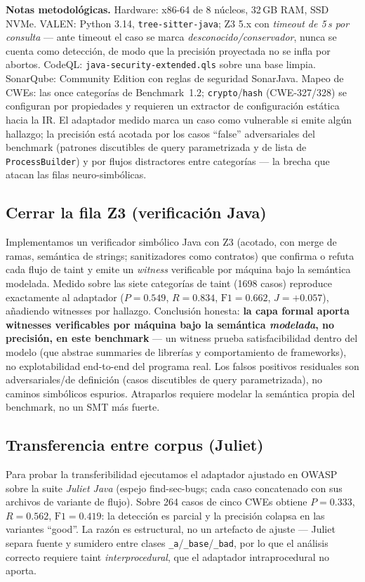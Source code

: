 \documentclass[11pt]{article}
\begin{document}
\noindent\textbf{Notas metodológicas.} Hardware: x86-64 de 8 núcleos, 32\,GB RAM,
SSD NVMe. VALEN: Python 3.14, \texttt{tree-sitter-java}; Z3 5.x con
\emph{timeout de 5\,s por consulta} --- ante timeout el caso se marca
\emph{desconocido/conservador}, nunca se cuenta como detección, de modo que la
precisión proyectada no se infla por abortos. CodeQL:
\texttt{java-security-extended.qls} sobre una base limpia. SonarQube: Community
Edition con reglas de seguridad SonarJava. Mapeo de CWEs: las once categorías de
Benchmark~1.2; \texttt{crypto}/\texttt{hash} (CWE-327/328) se configuran por
propiedades y requieren un extractor de configuración estática hacia la IR. El
adaptador medido marca un caso como vulnerable si emite algún hallazgo; la
precisión está acotada por los casos ``false'' adversariales del benchmark
(patrones discutibles de query parametrizada y de lista de \texttt{ProcessBuilder})
y por flujos distractores entre categorías --- la brecha que atacan las filas
neuro-simbólicas.

\subsection{Cerrar la fila Z3 (verificación Java)}
Implementamos un verificador simbólico Java con Z3 (acotado, con merge de ramas,
semántica de strings; sanitizadores como contratos) que confirma o refuta cada
flujo de taint y emite un \emph{witness} verificable por máquina bajo la semántica modelada. Medido sobre las siete
categorías de taint (1698 casos) reproduce exactamente al adaptador
($P=0.549$, $R=0.834$, $\mathrm{F1}=0.662$, $J=+0.057$), añadiendo witnesses por
hallazgo. Conclusión honesta: \textbf{la capa formal aporta witnesses
verificables por máquina bajo la semántica \emph{modelada}, no precisión, en este
benchmark} --- un witness prueba satisfacibilidad dentro del modelo (que abstrae
summaries de librerías y comportamiento de frameworks), no explotabilidad
end-to-end del programa real. Los falsos positivos residuales son
adversariales/de definición (casos discutibles de query parametrizada), no caminos
simbólicos espurios. Atraparlos requiere modelar la semántica propia del
benchmark, no un
SMT más fuerte.

\subsection{Transferencia entre corpus (Juliet)}
Para probar la transferibilidad ejecutamos el adaptador ajustado en OWASP sobre
la suite \emph{Juliet Java} (espejo find-sec-bugs; cada caso concatenado con sus
archivos de variante de flujo). Sobre 264 casos de cinco CWEs obtiene
$P=0.333$, $R=0.562$, $\mathrm{F1}=0.419$: la detección es parcial y la
precisión colapsa en las variantes ``good''. La razón es estructural, no un
artefacto de ajuste --- Juliet separa fuente y sumidero entre clases
\texttt{\_a}/\texttt{\_base}/\texttt{\_bad}, por lo que el análisis correcto
requiere taint \emph{interprocedural}, que el adaptador intraprocedural no aporta.
\end{document}
